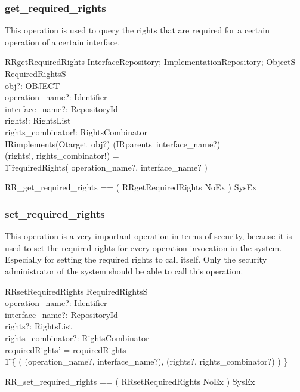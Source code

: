 \subsubsection{get\_required\_rights}
This operation is used to query the rights that are required for a certain
operation of a certain interface.
\begin{schema}{RRgetRequiredRights}
  \Xi InterfaceRepository; \Xi ImplementationRepository; \Xi ObjectS \\
  \Xi RequiredRightsS \\
  obj?: OBJECT \\
  operation\_name?: Identifier \\
  interface\_name?: RepositoryId \\
  rights!: RightsList \\
  rights\_combinator!: RightsCombinator \\
  \where
  IRimplements(Otarget~obj?) \in \ran (IRparents~interface\_name?) \\
  (rights!, rights\_combinator!) = \\
  \t1 requiredRights( operation\_name?, interface\_name? ) \\
\end{schema}
\begin{zed}
  RR\_get\_required\_rights == ( RRgetRequiredRights \land NoEx ) \lor SysEx
\end{zed}


\subsubsection{set\_required\_rights}
This operation is a very important operation in terms of security, because it is
used to set the required rights for every operation invocation in the system.
Especially for setting the required rights to call itself.  Only the security
administrator of the system should be able to call this operation.
\begin{schema}{RRsetRequiredRights}
  \Delta RequiredRightsS \\
  operation\_name?: Identifier \\
  interface\_name?: RepositoryId \\
  rights?: RightsList \\
  rights\_combinator?: RightsCombinator \\
  \where
  requiredRights' = requiredRights \oplus \\
  \t1 \{ ( (operation\_name?, interface\_name?), (rights?, rights\_combinator?)
  ) \} \\ 
\end{schema}
\begin{zed}
  RR\_set\_required\_rights == ( RRsetRequiredRights \land NoEx ) \lor SysEx
\end{zed}


